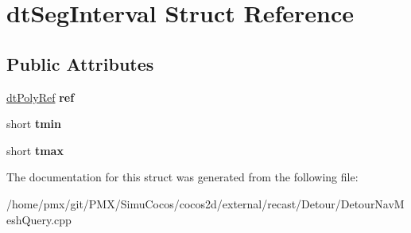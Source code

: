 \hypertarget{structdtSegInterval}{}\section{dt\+Seg\+Interval Struct Reference}
\label{structdtSegInterval}
\subsection*{Public Attributes}
\begin{DoxyCompactItemize}
\item 
\mbox{\label{structdtSegInterval_adeaef89322156ccfb6ecd7fc5e259b70}} 
\hyperlink{group__detour_gab4e0b2257a670c1a800057999612b466}{dt\+Poly\+Ref} {\bfseries ref}
\item 
\mbox{\label{structdtSegInterval_a93cb86ab8a97836ee145bb03bab7ed89}} 
short {\bfseries tmin}
\item 
\mbox{\label{structdtSegInterval_a4463687b08087da04f076ec79beb5c03}} 
short {\bfseries tmax}
\end{DoxyCompactItemize}


The documentation for this struct was generated from the following file\+:\begin{DoxyCompactItemize}
\item 
/home/pmx/git/\+P\+M\+X/\+Simu\+Cocos/cocos2d/external/recast/\+Detour/Detour\+Nav\+Mesh\+Query.\+cpp\end{DoxyCompactItemize}
